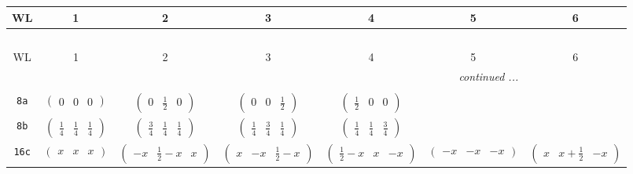 \documentclass[fleqn,9pt,landscape]{jsarticle}
\begin{document}
\begin{center}
\renewcommand{\arraystretch}{1.2}
\begin{longtable}{ccccccc}
 \hline \hline
WL & 1 & 2 & 3 & 4 & 5 & 6 \\ \hline \endfirsthead

\multicolumn{6}{l}{\tablename\ \thetable{}} \\
 \hline \hline
WL & 1 & 2 & 3 & 4 & 5 & 6 \\ \hline \endhead

 \hline \hline
\multicolumn{6}{r}{\footnotesize\it continued ...} \\ \endfoot

 \hline \hline
\multicolumn{6}{r}{} \\ \endlastfoot

{\tt 8a} & $ \begin{pmatrix} 0 & 0 & 0 \end{pmatrix} $ & $ \begin{pmatrix} 0 & \frac{1}{2} & 0 \end{pmatrix} $ & $ \begin{pmatrix} 0 & 0 & \frac{1}{2} \end{pmatrix} $ & $ \begin{pmatrix} \frac{1}{2} & 0 & 0 \end{pmatrix} $ & $  $ & $  $ \\ \hline
{\tt 8b} & $ \begin{pmatrix} \frac{1}{4} & \frac{1}{4} & \frac{1}{4} \end{pmatrix} $ & $ \begin{pmatrix} \frac{3}{4} & \frac{1}{4} & \frac{1}{4} \end{pmatrix} $ & $ \begin{pmatrix} \frac{1}{4} & \frac{3}{4} & \frac{1}{4} \end{pmatrix} $ & $ \begin{pmatrix} \frac{1}{4} & \frac{1}{4} & \frac{3}{4} \end{pmatrix} $ & $  $ & $  $ \\ \hline
{\tt 16c} & $ \begin{pmatrix} x & x & x \end{pmatrix} $ & $ \begin{pmatrix} - x & \frac{1}{2} - x & x \end{pmatrix} $ & $ \begin{pmatrix} x & - x & \frac{1}{2} - x \end{pmatrix} $ & $ \begin{pmatrix} \frac{1}{2} - x & x & - x \end{pmatrix} $ & $ \begin{pmatrix} - x & - x & - x \end{pmatrix} $ & $ \begin{pmatrix} x & x + \frac{1}{2} & - x \end{pmatrix} $ \\

\end{longtable}
\end{center}
\end{document}
